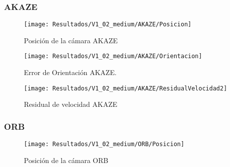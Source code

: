 \subsubsection{AKAZE}


\begin{figure}[H]
	\centering
	\texttt{[image: Resultados/V1\_02\_medium/AKAZE/Posicion]}
	\caption{Posición de la cámara AKAZE}
	\label{imagen:Resultados/V1_02_medium/AKAZE/Posicion}
\end{figure}


\begin{figure}[H]
	\centering
	\texttt{[image: Resultados/V1\_02\_medium/AKAZE/Orientacion]}
	\caption[Error de Orientación AKAZE]{Error de Orientación AKAZE.}
	\label{imagen:Resultados/V1_02_medium/AKAZE/Orientacion}
\end{figure}



\begin{figure}[H]
	\centering
	\texttt{[image: Resultados/V1\_02\_medium/AKAZE/ResidualVelocidad2]}
	\caption{Residual de velocidad AKAZE}
	\label{imagen:Resultados/V1_02_medium/AKAZE/ResidualVelocidad}
\end{figure}

\subsubsection{ORB}


\begin{figure}[H]
	\centering
	\texttt{[image: Resultados/V1\_02\_medium/ORB/Posicion]}
	\caption{Posición de la cámara ORB}
	\label{imagen:Resultados/V1_02_medium/ORB/Posicion}
\end{figure}



